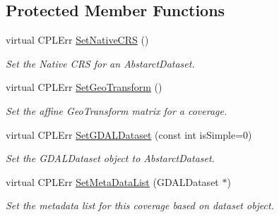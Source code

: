 \subsection*{Protected Member Functions}
\begin{DoxyCompactItemize}
\item 
virtual CPLErr \hyperlink{classAbstractDataset_acfac922d16e5edf51066169bd6ff28ec}{SetNativeCRS} ()
\begin{DoxyCompactList}\small\item\em Set the Native CRS for an AbstarctDataset. \end{DoxyCompactList}\item 
virtual CPLErr \hyperlink{classAbstractDataset_a1d79fc347de75acd57b18c80b9614369}{SetGeoTransform} ()
\begin{DoxyCompactList}\small\item\em Set the affine GeoTransform matrix for a coverage. \end{DoxyCompactList}\item 
virtual CPLErr \hyperlink{classAbstractDataset_a93bd80bfa48ad45ea53599f289406287}{SetGDALDataset} (const int isSimple=0)
\begin{DoxyCompactList}\small\item\em Set the GDALDataset object to AbstarctDataset. \end{DoxyCompactList}\item 
virtual CPLErr \hyperlink{classAbstractDataset_af3f0b55b14f660b79751bf88489a2c10}{SetMetaDataList} (GDALDataset $\ast$)
\begin{DoxyCompactList}\small\item\em Set the metadata list for this coverage based on dataset object. \end{DoxyCompactList}\end{DoxyCompactItemize}
